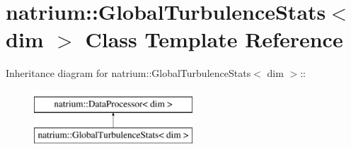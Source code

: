 \hypertarget{classnatrium_1_1GlobalTurbulenceStats}{
\section{natrium::GlobalTurbulenceStats$<$ dim $>$ Class Template Reference}
\label{classnatrium_1_1GlobalTurbulenceStats}
}
Inheritance diagram for natrium::GlobalTurbulenceStats$<$ dim $>$::\begin{figure}[H]
\begin{center}
\leavevmode
\includegraphics[height=2cm]{classnatrium_1_1GlobalTurbulenceStats}
\end{center}
\end{figure}
